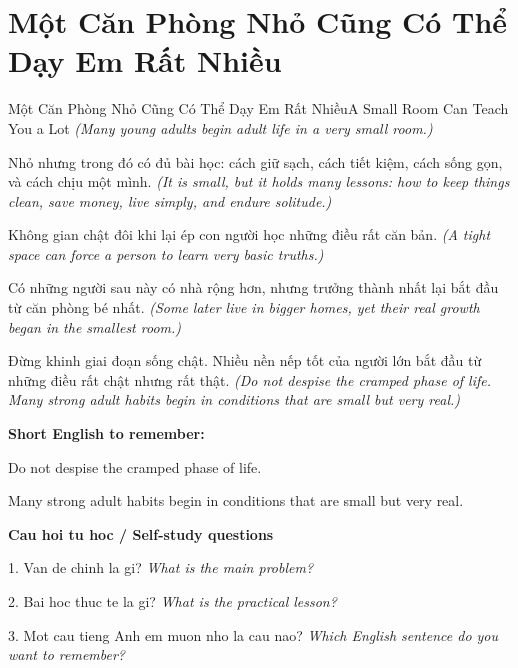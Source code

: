 \section{Một Căn Phòng Nhỏ Cũng Có Thể Dạy Em Rất Nhiều}
\begin{truyen}{Một Căn Phòng Nhỏ Cũng Có Thể Dạy Em Rất Nhiều}{A Small Room Can Teach You a Lot}
\textit{(Many young adults begin adult life in a very small room.)}

Nhỏ nhưng trong đó có đủ bài học: cách giữ sạch, cách tiết kiệm, cách sống gọn, và cách chịu một mình.
\textit{(It is small, but it holds many lessons: how to keep things clean, save money, live simply, and endure solitude.)}

Không gian chật đôi khi lại ép con người học những điều rất căn bản.
\textit{(A tight space can force a person to learn very basic truths.)}

Có những người sau này có nhà rộng hơn, nhưng trưởng thành nhất lại bắt đầu từ căn phòng bé nhất.
\textit{(Some later live in bigger homes, yet their real growth began in the smallest room.)}

\end{truyen}

\begin{baihoc}
Đừng khinh giai đoạn sống chật. Nhiều nền nếp tốt của người lớn bắt đầu từ những điều rất chật nhưng rất thật.
\textit{(Do not despise the cramped phase of life. Many strong adult habits begin in conditions that are small but very real.)}
\end{baihoc}

\begin{ghinhoanh}
\textbf{Short English to remember:}

Do not despise the cramped phase of life.

Many strong adult habits begin in conditions that are small but very real.

\end{ghinhoanh}

\begin{tuhocnhanh}
\textbf{Cau hoi tu hoc / Self-study questions}

1. Van de chinh la gi? \textit{What is the main problem?}

2. Bai hoc thuc te la gi? \textit{What is the practical lesson?}

3. Mot cau tieng Anh em muon nho la cau nao? \textit{Which English sentence do you want to remember?}
\end{tuhocnhanh}
\ngancach

